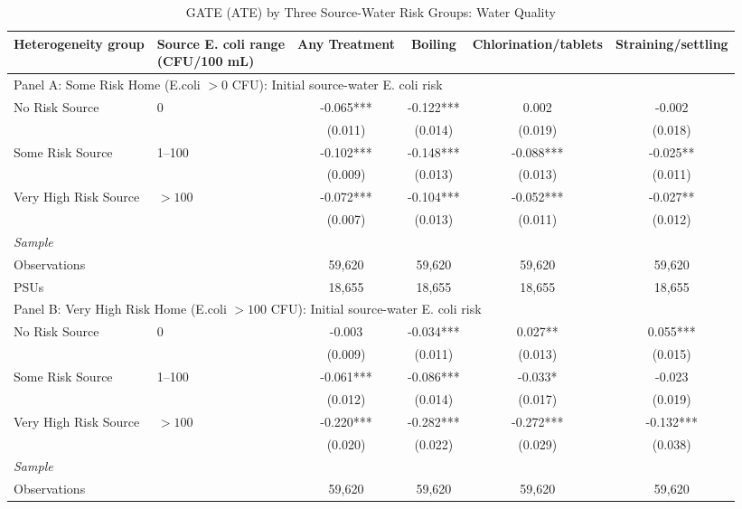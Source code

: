 \begin{landscape}
\begin{table}[p]
\centering
\caption{GATE (ATE) by Three Source-Water Risk Groups: Water Quality}
\label{tab:table_gate_main_risk_groups-ecoli}
\scriptsize\setlength{\tabcolsep}{4pt}
\begin{adjustbox}{max width=\linewidth, center}
\begin{tabular}{llcccc}
\toprule
Heterogeneity group & \shortstack{Source E. coli range\\(CFU/100 mL)} & Any Treatment & Boiling & Chlorination/tablets & Straining/settling \\
\midrule
\multicolumn{6}{l}{Panel A: Some Risk Home (E.coli $>0$ CFU): Initial source-water E. coli risk} \\
No Risk Source & 0 & -0.065*** & -0.122*** & 0.002 & -0.002 \\
 &  & (0.011) & (0.014) & (0.019) & (0.018) \\
Some Risk Source & 1--100 & -0.102*** & -0.148*** & -0.088*** & -0.025** \\
 &  & (0.009) & (0.013) & (0.013) & (0.011) \\
Very High Risk Source & $>100$ & -0.072*** & -0.104*** & -0.052*** & -0.027** \\
 &  & (0.007) & (0.013) & (0.011) & (0.012) \\
\multicolumn{6}{l}{\textit{Sample}} \\
\quad Observations &  & 59,620 & 59,620 & 59,620 & 59,620 \\
\quad PSUs &  & 18,655 & 18,655 & 18,655 & 18,655 \\
\midrule
\multicolumn{6}{l}{Panel B: Very High Risk Home (E.coli $>100$ CFU): Initial source-water E. coli risk} \\
No Risk Source & 0 & -0.003 & -0.034*** & 0.027** & 0.055*** \\
 &  & (0.009) & (0.011) & (0.013) & (0.015) \\
Some Risk Source & 1--100 & -0.061*** & -0.086*** & -0.033* & -0.023 \\
 &  & (0.012) & (0.014) & (0.017) & (0.019) \\
Very High Risk Source & $>100$ & -0.220*** & -0.282*** & -0.272*** & -0.132*** \\
 &  & (0.020) & (0.022) & (0.029) & (0.038) \\
\multicolumn{6}{l}{\textit{Sample}} \\
\quad Observations &  & 59,620 & 59,620 & 59,620 & 59,620 \\

\end{tabular}
\end{adjustbox}
\end{table}
\end{landscape}
